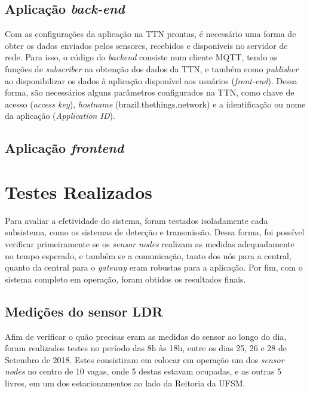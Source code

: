 \documentclass[oneside,openright,12pt]{ufsm_2015} %
\begin{document}
    \subsection{Aplicação \textit{back-end}}
    Com as configurações da aplicação na TTN prontas, é necessário uma forma de obter os dados enviados pelos sensores, recebidos e disponíveis no servidor de rede. 
    Para isso, o código do \textit{backend} consiste num cliente MQTT, tendo as funções de \textit{subscriber} na obtenção dos dados da TTN, e também como \textit{publisher} ao disponibilizar os dados à aplicação disponível aos usuários (\textit{front-end}). Dessa forma, são necessários alguns parâmetros configurados na TTN, como chave de acesso (\textit{access key}), \textit{hostname} (brazil.thethings.network) e a identificação ou nome da aplicação (\textit{Application ID}).
    
    
    \subsection{Aplicação \textit{frontend}}
    
    
    \section{Testes Realizados}
    Para avaliar a efetividade do sistema, foram testados isoladamente cada subsistema, como os sistemas de detecção e transmissão. Dessa forma, foi possível verificar primeiramente se os \textit{sensor nodes} realizam as medidas adequadamente no tempo esperado, e também se a comunicação, tanto dos nós para a central, quanto da central para o \textit{gateway} eram robustas para a aplicação. Por fim, com o sistema completo em operação, foram obtidos os resultados finais.

    \subsection{Medições do sensor LDR}
    Afim de verificar o quão precisas eram as medidas do sensor ao longo do dia, foram realizados testes no período das 8h às 18h, entre os dias 25, 26 e 28 de Setembro de 2018. Estes consistiram em colocar em operação um dos \textit{sensor nodes} no centro de 10 vagas, onde 5 destas estavam ocupadas, e as outras 5 livres, em um dos estacionamentos ao lado da Reitoria da UFSM. 
    
\end{document}
